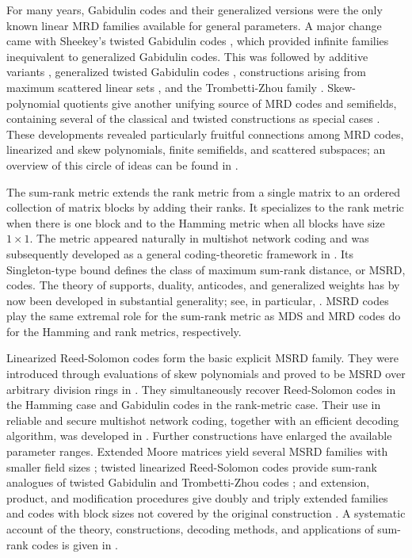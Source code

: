 \documentclass[10pt,a4paper]{amsart}
\theoremstyle{definition}
\theoremstyle{plain}
\theoremstyle{remark}
\begin{document}
For many years, Gabidulin codes and their generalized versions were the only
known linear MRD families available for general parameters.  A major change
came with Sheekey's twisted Gabidulin codes \cite{She16}, which provided
infinite families inequivalent to generalized Gabidulin codes.  This was
followed by additive variants \cite{OO17}, generalized twisted Gabidulin
codes \cite{LTZ18}, constructions arising from maximum scattered linear sets
\cite{CMPZ18}, and the Trombetti-Zhou family \cite{TZ19}.  Skew-polynomial
quotients give another unifying source of MRD codes and semifields, containing
several of the classical and twisted constructions as special cases
\cite{She20}.  These developments revealed particularly fruitful
connections among MRD codes, linearized and skew polynomials, finite
semifields, and scattered subspaces; an overview of this circle of ideas can
be found in \cite{She19}.

The sum-rank metric extends the rank metric from a single matrix to an ordered
collection of matrix blocks by adding their ranks.  It specializes to the
rank metric when there is one block and to the Hamming metric when all blocks
have size $1\times 1$.  The metric appeared naturally in multishot network
coding \cite{NU10} and was subsequently developed as a general coding-theoretic
framework in \cite{MtP18,MtP19,BGLR21,MSK22}.  Its Singleton-type bound
defines the class of maximum sum-rank distance, or MSRD, codes.  The theory of
supports, duality, anticodes, and generalized weights has by now been
developed in substantial generality; see, in particular,
\cite{MtP19,BGLR21,CampsEtAl22}.  MSRD codes play the same extremal role for
the sum-rank metric as MDS and MRD codes do for the Hamming and rank metrics,
respectively.

Linearized Reed-Solomon codes form the basic explicit MSRD family.  They were
introduced through evaluations of skew polynomials and proved to be MSRD over
arbitrary division rings in \cite{MtP18}.  They simultaneously recover
Reed-Solomon codes in the Hamming case and Gabidulin codes in the rank-metric
case.  Their use in reliable and secure multishot network coding, together
with an efficient decoding algorithm, was developed in \cite{MPK19}.
Further constructions have enlarged the available parameter
ranges.  Extended Moore matrices yield several MSRD families with smaller
field sizes \cite{MtP22Moore}; twisted linearized Reed-Solomon codes provide
sum-rank analogues of twisted Gabidulin and Trombetti-Zhou codes
\cite{Neri22}; and extension, product, and modification procedures give
doubly and triply extended families and codes with block sizes not covered by
the original construction \cite{MtP23Extended,MtP24New}.  A systematic
account of the theory, constructions, decoding methods, and applications of
sum-rank codes is given in \cite{MSK22}.
\end{document}
